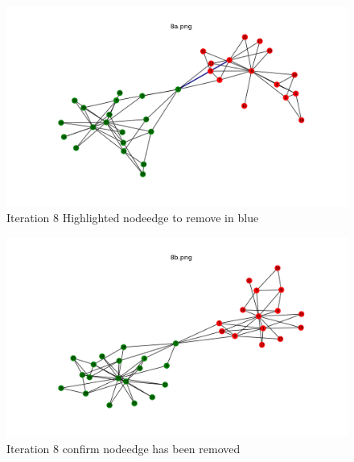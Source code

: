 \documentclass[12pt]{article}
\begin{document}
\begin{figure}[H]
\centering
\includegraphics[trim=0 0 0 0, clip, width=\textwidth] {8a.png}
\caption{Iteration 8 Highlighted nodeedge to remove in blue }
\label{fig:q18a}
\end{figure}
\begin{figure}[H]
\centering
\includegraphics[trim=0 0 0 0, clip, width=\textwidth] {8b.png}
\caption{Iteration 8 confirm nodeedge has been removed }
\label{fig:q18b}
\end{figure}
\end{document}
